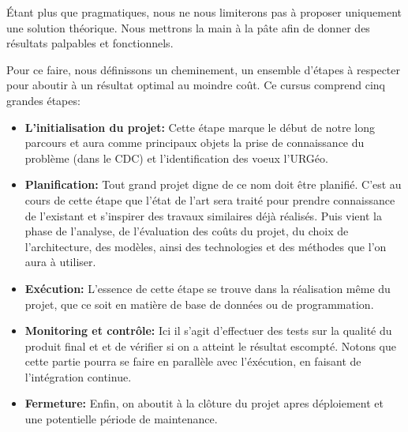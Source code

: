 \par
Étant plus que pragmatiques, nous ne nous limiterons pas à proposer 
uniquement une solution théorique. Nous mettrons la main à la pâte afin
de donner des résultats palpables et fonctionnels.
\par
Pour ce faire, nous définissons un cheminement, un ensemble d'étapes à 
respecter pour aboutir à un résultat optimal au moindre coût.
Ce cursus comprend cinq grandes étapes: 

\begin{itemize}
    \item \textbf{L'initialisation du projet: }
    Cette étape marque le début de notre long parcours et aura comme principaux
    objets la prise de connaissance du problème (dans le CDC) et l'identification des voeux
    l'URGéo.
    \item \textbf{Planification: }
    Tout grand projet digne de ce nom doit être planifié. C'est au cours de cette étape
    que l'état de l'art sera traité pour prendre connaissance de l'existant et s'inspirer des travaux
    similaires déjà réalisés. Puis vient la phase de l'analyse, de l'évaluation des coûts du projet, 
    du choix  de l'architecture, des modèles,
    ainsi des technologies et des méthodes que l'on aura à utiliser.
    \item \textbf{Exécution: }
    L'essence de cette étape se trouve dans la réalisation même du projet, que ce soit en matière de base de 
    données ou de programmation.
    \item \textbf{Monitoring et contrôle: }
    Ici il s'agit d'effectuer des tests sur la qualité du produit final et et de vérifier si on a atteint le 
    résultat escompté. Notons que cette partie pourra se faire en parallèle avec l'éxécution, en faisant de 
    l'intégration continue.
    \item \textbf{Fermeture: }
    Enfin, on aboutit à la clôture du projet apres déploiement et une potentielle période de maintenance.


\end{itemize}  